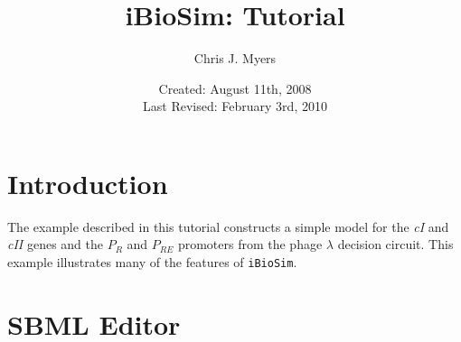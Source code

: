 \documentclass[titlepage,11pt]{article}
\title{iBioSim: Tutorial}
\author{Chris J. Myers}
\date{Created: August 11th, 2008\\
  Last Revised: February 3rd, 2010
}
\begin{document}
\maketitle

  
\tableofcontents

\clearpage
  

\section{Introduction}

The example described in this tutorial constructs a simple model for
the \emph{cI} and \emph{cII} genes and the $P_R$ and $P_{RE}$
promoters from the phage $\lambda$ decision circuit.  This example
illustrates many of the features of {\tt iBioSim}.


\section{SBML Editor}
\end{document}
